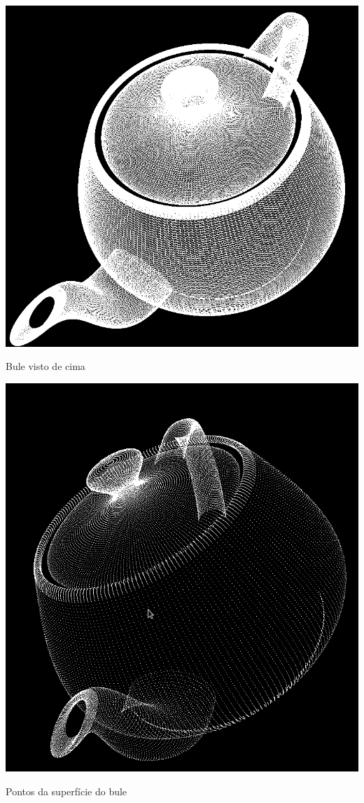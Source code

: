 \begin{center}	
 	\includegraphics[width=\textwidth,height=\textheight,keepaspectratio]{resources/teapotCima.png}
 	\captionsetup{type=figure, width=0.8\linewidth}
	\caption{Bule visto de cima}
\label{fig:teapotabove} 
\end{center}


\begin{center}	
 	\includegraphics[width=\textwidth,height=\textheight,keepaspectratio]{resources/teapotPontos}
 	\captionsetup{type=figure, width=0.8\linewidth}
	\caption{Pontos da superfície do bule}
\label{fig:teapotpoints} 
\end{center}

